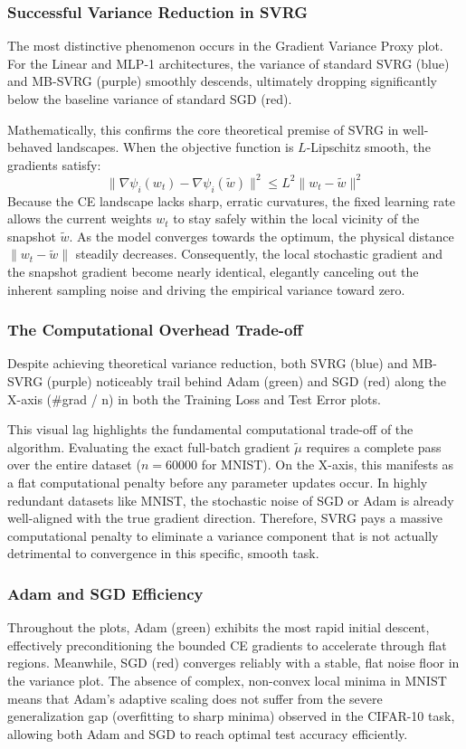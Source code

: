 \documentclass[11pt,a4paper]{article}
\begin{document}
\subsubsection{Successful Variance Reduction in SVRG}
The most distinctive phenomenon occurs in the Gradient Variance Proxy plot. For the Linear and MLP-1 architectures, the variance of standard SVRG (blue) and MB-SVRG (purple) smoothly descends, ultimately dropping significantly below the baseline variance of standard SGD (red). 

Mathematically, this confirms the core theoretical premise of SVRG in well-behaved landscapes. When the objective function is $L$-Lipschitz smooth, the gradients satisfy:
\begin{equation}
\| \nabla \psi_i(w_t) - \nabla \psi_i(\tilde{w}) \|^2 \leq L^2 \| w_t - \tilde{w} \|^2
\end{equation}
Because the CE landscape lacks sharp, erratic curvatures, the fixed learning rate allows the current weights $w_t$ to stay safely within the local vicinity of the snapshot $\tilde{w}$. As the model converges towards the optimum, the physical distance $\| w_t - \tilde{w} \|$ steadily decreases. Consequently, the local stochastic gradient and the snapshot gradient become nearly identical, elegantly canceling out the inherent sampling noise and driving the empirical variance toward zero.

\subsubsection{The Computational Overhead Trade-off}
Despite achieving theoretical variance reduction, both SVRG (blue) and MB-SVRG (purple) noticeably trail behind Adam (green) and SGD (red) along the X-axis (\#grad / n) in both the Training Loss and Test Error plots. 

This visual lag highlights the fundamental computational trade-off of the algorithm. Evaluating the exact full-batch gradient $\tilde{\mu}$ requires a complete pass over the entire dataset ($n=60000$ for MNIST). On the X-axis, this manifests as a flat computational penalty before any parameter updates occur. In highly redundant datasets like MNIST, the stochastic noise of SGD or Adam is already well-aligned with the true gradient direction. Therefore, SVRG pays a massive computational penalty to eliminate a variance component that is not actually detrimental to convergence in this specific, smooth task.

\subsubsection{Adam and SGD Efficiency}
Throughout the plots, Adam (green) exhibits the most rapid initial descent, effectively preconditioning the bounded CE gradients to accelerate through flat regions. Meanwhile, SGD (red) converges reliably with a stable, flat noise floor in the variance plot. The absence of complex, non-convex local minima in MNIST means that Adam's adaptive scaling does not suffer from the severe generalization gap (overfitting to sharp minima) observed in the CIFAR-10 task, allowing both Adam and SGD to reach optimal test accuracy efficiently.
\end{document}
